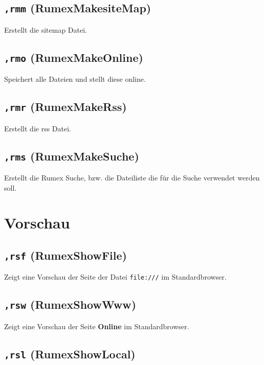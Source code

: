 \subsection{\texttt{,rmm}
(RumexMakesiteMap)}\label{rmm-rumexmakesitemap}

Erstellt die sitemap Datei.

\subsection{\texttt{,rmo} (RumexMakeOnline)}\label{rmo-rumexmakeonline}

Speichert alle Dateien und stellt diese online.

\subsection{\texttt{,rmr} (RumexMakeRss)}\label{rmr-rumexmakerss}

Erstellt die rss Datei.

\subsection{\texttt{,rms} (RumexMakeSuche)}\label{rms-rumexmakesuche}

Erstellt die Rumex Suche, bzw. die Dateiliste die für die Suche
verwendet werden soll.

\section{Vorschau}\label{vorschau}

\subsection{\texttt{,rsf} (RumexShowFile)}\label{rsf-rumexshowfile}

Zeigt eine Vorschau der Seite der Datei \texttt{file:///} im
Standardbrowser.

\subsection{\texttt{,rsw} (RumexShowWww)}\label{rsw-rumexshowwww}

Zeigt eine Vorschau der Seite \textbf{Online} im Standardbrowser.

\subsection{\texttt{,rsl} (RumexShowLocal)}\label{rsl-rumexshowlocal}

